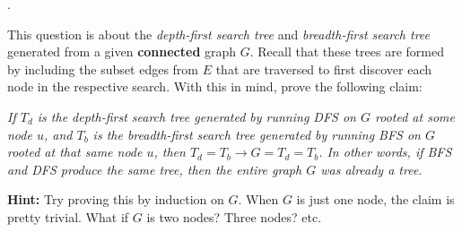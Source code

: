 \documentclass[12pt]{article}
\newcounter{quesnum}
\newcommand{\question}[2][??]{
\begin{list}{\labelitemi}{\leftmargin=2em}
\item [\arabic{quesnum}.] {#2}
\end{list}
\addtocounter{quesnum}{1}
}
\begin{document}
\question[3]{
This question is about the \emph{depth-first search tree} and \emph{breadth-first search tree} generated from a given \textbf{connected} graph $G$. Recall that these trees are formed by including the subset edges from $E$ that are traversed to first discover each node in the respective search. With this in mind, prove the following claim:

\emph{If $T_d$ is the depth-first search tree generated by running DFS on $G$ rooted at some node $u$, and $T_b$ is the breadth-first search tree generated by running BFS on $G$ rooted at that same node $u$, then $T_d=T_b \to G=T_d=T_b$. In other words, if BFS and DFS produce the same tree, then the entire graph $G$ was already a tree.}

\textbf{Hint:} Try proving this by induction on $G$. When $G$ is just one node, the claim is pretty trivial. What if $G$ is two nodes? Three nodes? etc.
}
\end{document}
